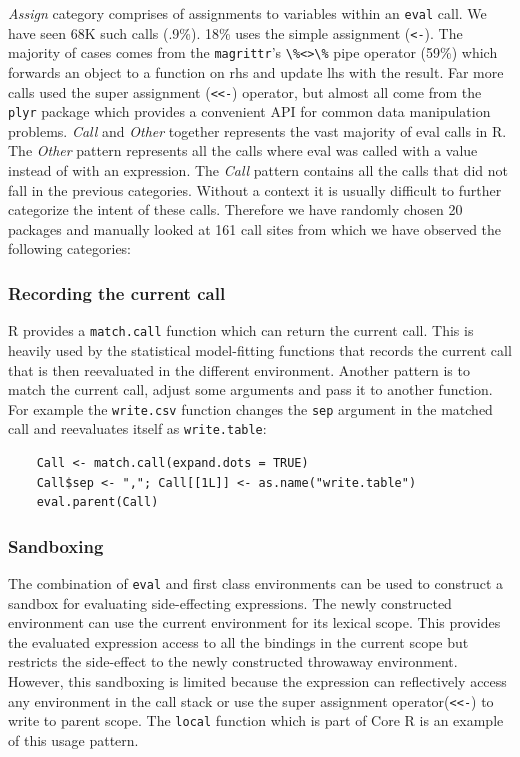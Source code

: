 \documentclass[USenglish,cleveref, autoref, thm-restate]{lipics-v2019}
\newcommand{\PatternAssignRnd}{68K\xspace}
\newcommand{\PatternAssignRatio}{.9\%\xspace}
\newcommand{\PatternAssignArrowRatio}{18\%\xspace}
\newcommand{\PatternAssignArrowMagrittrRatio}{59\%\xspace}
\newcommand{\PatternManualPackages}{20\xspace}
\newcommand{\PatternManualCallsites}{161\xspace}
\newcommand{\eval}{\texttt{eval}\xspace}
\renewcommand{\c}[1]{\lstinline{#1}\xspace}
\begin{document}
%
\noindent \emph{Assign} category comprises of assignments to variables
within an \eval call. We have seen \PatternAssignRnd such calls
(\PatternAssignRatio).  \PatternAssignArrowRatio uses the simple assignment
(\c{<-}). The majority of cases comes from the \c{magrittr}'s \c{\%<>\%}
pipe operator (\PatternAssignArrowMagrittrRatio) which forwards an object to
a function on rhs and update lhs with the result. Far more calls used the
super assignment (\c{<<-}) operator, but almost all come from the \c{plyr}
package which provides a convenient API for common data manipulation
problems.
%
\noindent \emph{Call} and \emph{Other} together represents the vast majority
of eval calls in R. The \emph{Other} pattern represents all the calls where
eval was called with a value instead of with an expression. The \emph{Call}
pattern contains all the calls that did not fall in the previous
categories. Without a context it is usually difficult to further categorize
the intent of these calls.  Therefore we have randomly chosen
\PatternManualPackages packages and manually looked at
\PatternManualCallsites call sites from which we have observed the following
categories:

\subsubsection{Recording the current call} R provides a \c{match.call} function
which can return the current call. This is heavily used by the statistical
model-fitting functions that records the current call that is then
reevaluated in the different environment. Another pattern is to match the
current call, adjust some arguments and pass it to another function. For
example the \c{write.csv} function changes the \c{sep} argument in the
matched call and reevaluates itself as \c{write.table}:
%
\begin{lstlisting}
    Call <- match.call(expand.dots = TRUE)
    Call$sep <- ","; Call[[1L]] <- as.name("write.table")
    eval.parent(Call)
\end{lstlisting}

\subsubsection{Sandboxing} The combination of \eval and first class
environments can be used to construct a sandbox for evaluating
side-effecting expressions. The newly constructed environment can use the
current environment for its lexical scope. This provides the evaluated
expression access to all the bindings in the current scope but restricts the
side-effect to the newly constructed throwaway environment. However, this
sandboxing is limited because the expression can reflectively access any
environment in the call stack or use the super assignment operator(\c{<<-})
to write to parent scope. The \c{local} function which is part of Core R is
an example of this usage pattern.
\end{document}
